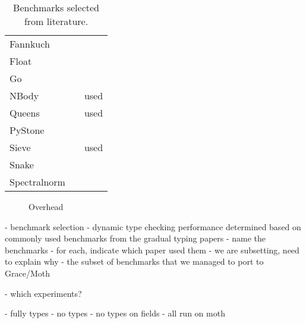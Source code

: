 \begin{table}
\caption{Benchmarks selected from literature.}
\label{tab:gradual-benchmarks}
\begin{tabular}{l l r}
Fannkuch & \cite{Vitousek2017,Greenman2018} \\
Float & \cite{Vitousek2017,Muehlboeck2017,Greenman2018} \\
Go & \cite{Vitousek2017,Muehlboeck2017,Greenman2018} \\
NBody & \cite{Kuhlenschmidt:2018:preprint,Vitousek2017,Greenman2018} & used \cite{Marr2016} \\
Queens & \cite{Vitousek2017,Muehlboeck2017,Greenman2018} & used \cite{Marr2016} \\
PyStone & \cite{Vitousek2017,Muehlboeck2017,Greenman2018} \\
Sieve & \cite{Takikawa2016,Muehlboeck2017,Bauman2017,Richards2017} & used \cite{Marr2016} \\
Snake & \cite{Takikawa2016,Muehlboeck2017,Bauman2017,Richards2017} \\
Spectralnorm & \cite{Vitousek2017,Muehlboeck2017,Greenman2018} \\
\end{tabular}
\end{table}

\begin{figure}
	\TypingOverhead{}
	\caption{Overhead}
	\label{fig:typing-overhead}
\end{figure}

\begin{cnote}
- benchmark selection
 - dynamic type checking performance determined based on commonly used
   benchmarks from the gradual typing papers
   - name the benchmarks
   - for each, indicate which paper used them
   - we are subsetting, need to explain why
     - the subset of benchmarks that we managed to port to Grace/Moth


  - which experiments?
  
  - fully types
  - no types
  - no types on fields
  - all run on moth

\end{cnote}

